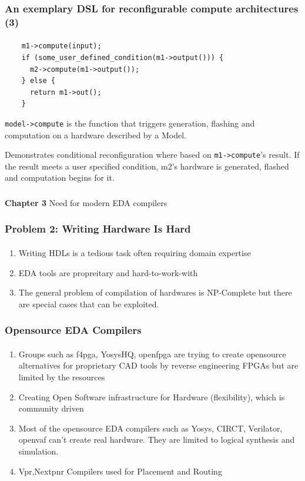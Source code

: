 \documentclass{beamer}
\begin{document}
\begin{frame}[fragile]
  \frametitle{An exemplary DSL for reconfigurable compute architectures (3)}
\framesubtitle{}
  \begin{verbatim}
    m1->compute(input);
    if (some_user_defined_condition(m1->output())) {
      m2->compute(m1->output());
    } else {
      return m1->out();
    }
\end{verbatim}
  \texttt{model->compute} is the function that triggers generation, flashing and
  computation on a hardware described by a Model.

  Demonstrates conditional reconfiguration where based on \texttt{m1->compute}'s
  result. If the result meets a user specified condition, m2's hardware is
  generated, flashed and computation begins for it.
\end{frame}

\begin{frame}[c,fragile]
  \frametitle{}

  \centering
  \textbf{Chapter 3} 
  \centering
  Need for modern EDA compilers
\end{frame}

\begin{frame}[fragile]
  \frametitle{Problem 2: Writing Hardware Is Hard}
  \framesubtitle{}
  \begin{enumerate}
    \item Writing HDLs is a tedious task often requiring domain expertise
    \item EDA tools are propreitary and hard-to-work-with
    \item The general problem of compilation of hardwares is NP-Complete but
      there are special cases that can be exploited.
  \end{enumerate}
\end{frame}


\begin{frame}[fragile]
  \frametitle{Opensource EDA Compilers}
  \framesubtitle{}
  \begin{enumerate}
    \item Groups such as f4pga, YosysHQ, openfpga are trying to create opensource
      alternatives for proprietary CAD tools by reverse engineering FPGAs
      but are limited by the resources 
    \item Creating Open Software infrastructure for Hardware (flexibility),
      which is community driven 
    \item Most of the opensource EDA compilers such as Yosys, CIRCT, Verilator,
      openvaf can't create real hardware. They are limited to
      logical synthesis and simulation.
     \item Vpr\cite{vpr2},Nextpnr\cite{nextpnr1} Compilers used for Placement and Routing  
  \end{enumerate}

\end{frame}
\end{document}
